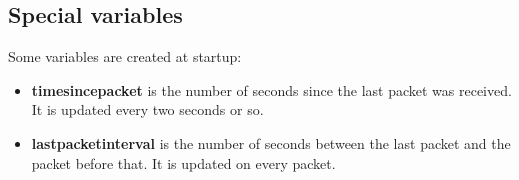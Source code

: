 \subsection{Special variables}
Some variables are created at startup:
\begin{itemize}
\item \textbf{timesincepacket} is the number of seconds since the last packet
was received. It is updated every two seconds or so.
\item \textbf{lastpacketinterval} is the number of seconds between the last
packet and the packet before that. It is updated on every packet.
\end{itemize}

